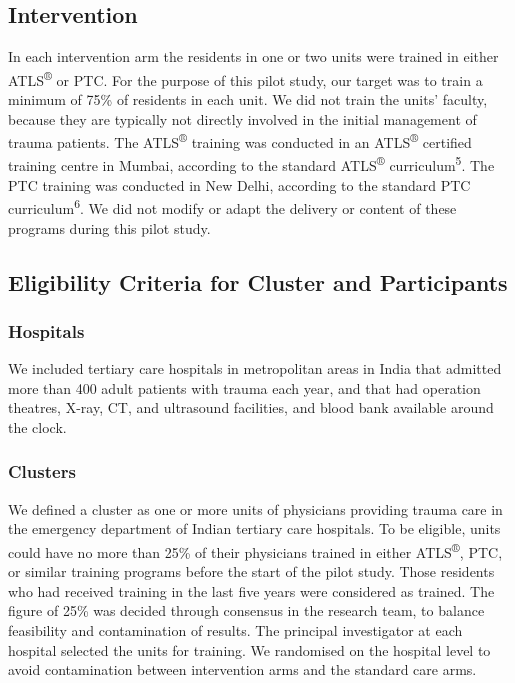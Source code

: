 \documentclass[
]{article}
\begin{document}
\hypertarget{intervention}{%
\subsection{Intervention}\label{intervention}}

In each intervention arm the residents in one or two units were trained in either ATLS\textsuperscript{®} or PTC. For the purpose of this pilot study, our target was to train a minimum of 75\% of residents in each unit. We did not train the units' faculty, because they are typically not directly involved in the initial management of trauma patients. The ATLS\textsuperscript{®} training was conducted in an ATLS\textsuperscript{®} certified training centre in Mumbai, according to the standard ATLS\textsuperscript{®} curriculum\textsuperscript{5}. The PTC training was conducted in New Delhi, according to the standard PTC curriculum\textsuperscript{6}. We did not modify or adapt the delivery or content of these programs during this pilot study.

\hypertarget{eligibility-criteria-for-cluster-and-participants}{%
\subsection{Eligibility Criteria for Cluster and Participants}\label{eligibility-criteria-for-cluster-and-participants}}

\hypertarget{hospitals}{%
\subsubsection{Hospitals}\label{hospitals}}

We included tertiary care hospitals in metropolitan areas in India that admitted more than 400 adult patients with trauma each year, and that had operation theatres, X-ray, CT, and ultrasound facilities, and blood bank available around the clock.

\hypertarget{clusters}{%
\subsubsection{Clusters}\label{clusters}}

We defined a cluster as one or more units of physicians providing trauma care in the emergency department of Indian tertiary care hospitals. To be eligible, units could have no more than 25\% of their physicians trained in either ATLS\textsuperscript{®}, PTC, or similar training programs before the start of the pilot study. Those residents who had received training in the last five years were considered as trained. The figure of 25\% was decided through consensus in the research team, to balance feasibility and contamination of results. The principal investigator at each hospital selected the units for training. We randomised on the hospital level to avoid contamination between intervention arms and the standard care arms.
\end{document}
